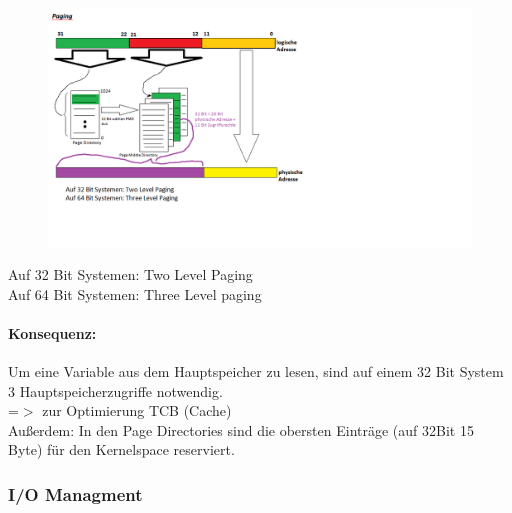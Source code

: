 \documentclass[12pt,a4paper,oneside,ngerman]{article}
\begin{document}
\begin{figure}[ht]
	\centering
	\includegraphics[scale=0.8]{umlet/Paging.png}
\end{figure}

Auf 32 Bit Systemen: Two Level Paging\\
Auf 64 Bit Systemen: Three Level paging\\

\paragraph{Konsequenz:}
Um eine Variable aus dem Hauptspeicher zu lesen, sind auf einem 32 Bit System 3 Hauptspeicherzugriffe notwendig.\\
=$>$ zur Optimierung TCB (Cache)\\
Außerdem: In den Page Directories sind die obersten Einträge (auf 32Bit 15 Byte) für den Kernelspace reserviert.

\subsubsection{I/O Managment}
\end{document}
